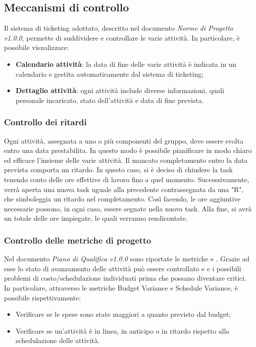 \subsection{Meccanismi di controllo}
Il sistema di ticketing adottato, descritto nel documento \emph{Norme di Progetto v1.0.0}, permette di suddividere e controllare le varie attività. In particolare, è possibile visualizzare:
\begin{itemize}
\item{\textbf{Calendario attività}}: la data di fine delle varie attività è indicata in un calendario e gestita automaticamente dal sistema di ticketing;  
\item{\textbf{Dettaglio attività}}: ogni attività include diverse informazioni, quali personale incaricato, stato dell'attività e data di fine prevista. 
\end{itemize}
\subsubsection{Controllo dei ritardi}
Ogni attività, assegnata a uno o più componenti del gruppo, deve essere svolta entro una data prestabilita. In questo modo è possibile pianificare in modo chiaro ed efficace l'insieme delle varie attività. Il mancato completamento entro la data prevista comporta un ritardo. In questo caso, si è deciso di chiudere la task tenendo conto delle ore effettive di lavoro fino a quel momento. Successivamente, verrà aperta una nuova task uguale alla precedente contrassegnata da una "R", che simboleggia un ritardo nel completamento. Così facendo, le ore aggiuntive necessarie possono, in ogni caso, essere segnate nella nuova task. Alla fine, si avrà un totale delle ore impiegate, le quali verranno rendicontate.

\subsubsection{Controllo delle metriche di progetto}
Nel documento \emph{Piano di Qualifica v1.0.0} sono riportate le metriche  e . Grazie ad esse lo stato di avanzamento delle attività può essere controllato e  e i possibili problemi di costo/schedulazione individuati prima che possano diventare critici. In particolare, attraverso le metriche Budget Variance e Schedule Variance, è possibile rispettivamente:
\begin{itemize}
\item{Verificare se le spese sono state maggiori a quanto previsto dal budget;}
\item{Verificare se un'attività è in linea, in anticipo o in ritardo rispetto alla schedulazione delle attività.}
\end{itemize}

